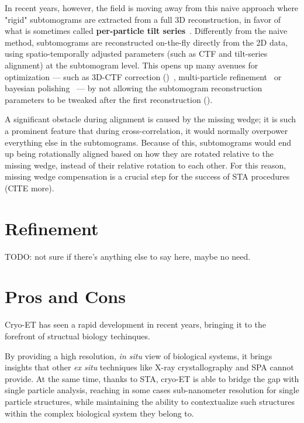 In recent years, however, the field is moving away from this naive approach where "rigid" subtomograms are extracted from a full 3D reconstruction, in favor of what is sometimes called \textbf{per-particle tilt series}~\cite{zivanovBayesianApproachSingleparticle2022,tegunovRealtimeCryoelectronMicroscopy2019,chenCompleteDataProcessing2019}.
Differently from the naive method, subtomograms are reconstructed on-the-fly directly from the 2D data, using spatio-temporally adjusted parameters (such as CTF and tilt-series alignment) at the subtomogram level.
This opens up many avenues for optimization --- such as 3D-CTF correction ()~\cite{turonovaEfficient3DCTFCorrection2017}, multi-particle refinement~\cite{tegunovMultiparticleCryoEMRefinement2021} or bayesian polishing~\cite{zivanovBayesianApproachSingleparticle2022} --- by not allowing the subtomogram reconstruction parameters to be tweaked after the first reconstruction ().

A significant obstacle during alignment is caused by the missing wedge; it is such a prominent feature that during cross-correlation, it would normally overpower everything else in the subtomograms.
Because of this, subtomograms would end up being rotationally aligned based on how they are rotated relative to the missing wedge, instead of their relative rotation to each other.
For this reason, missing wedge compensation is a crucial step for the success of STA procedures~\cite{galaz-montoyaAlignmentAlgorithmsPerparticle2016} (CITE more).

\section{Refinement}\label{et_refinement}

TODO: not sure if there's anything else to say here, maybe no need.

\section{Pros and Cons}

Cryo-ET has seen a rapid development in recent years, bringing it to the forefront of structual biology techinques.

By providing a high resolution, \textit{in situ} view of biological systems, it brings insights that other \textit{ex situ} techniques like X-ray crystallography and SPA cannot provide.
At the same time, thanks to STA, cryo-ET is able to bridge the gap with single particle analysis, reaching in some cases sub-nanometer resolution for single particle structures, while maintaining the ability to contextualize such structures within the complex biological system they belong to.

